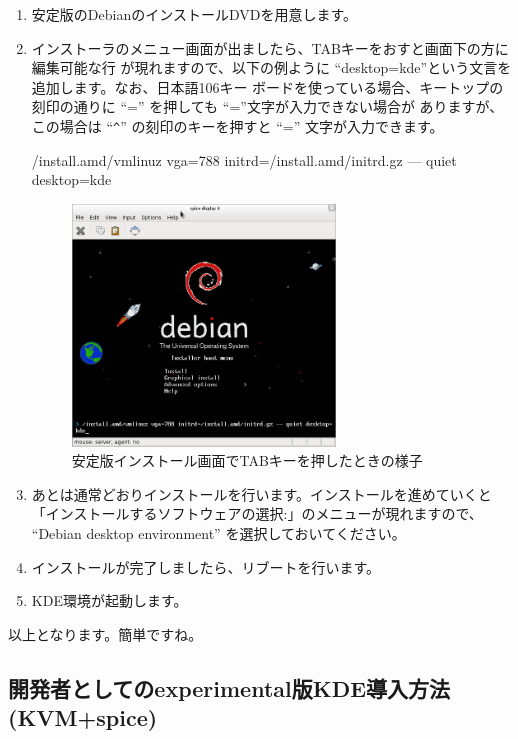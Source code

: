 \documentclass[mingoth,a4paper]{jsarticle}
\begin{document}
\begin{enumerate}
 \item 安定版のDebianのインストールDVDを用意します。
 \item インストーラのメニュー画面が出ましたら、TABキーをおすと画面下の方に編集可能な行
が現れますので、以下の例ように ``desktop=kde''という文言を追加します。なお、日本語106キー
ボードを使っている場合、キートップの刻印の通りに ``='' を押しても ``=''文字が入力できない場合が
ありますが、この場合は ``\verb|^|'' の刻印のキーを押すと ``='' 文字が入力できます。

\begin{commandline}
 /install.amd/vmlinuz vga=788 initrd=/install.amd/initrd.gz --- quiet desktop=kde
\end{commandline}

\begin{figure}[ht]
\begin{center}
\includegraphics[width=7cm]{image201202/kdedesk/stable-inst-menu.png}
\caption{安定版インストール画面でTABキーを押したときの様子}
\end{center}
\end{figure}
\item あとは通常どおりインストールを行います。インストールを進めていくと
「インストールするソフトウェアの選択:」のメニューが現れますので、 ``Debian desktop environment''
を選択しておいてください。
\item インストールが完了しましたら、リブートを行います。
\item KDE環境が起動します。
\end{enumerate}

以上となります。簡単ですね。

\subsection{開発者としてのexperimental版KDE導入方法(KVM+spice)}
\label{sec:exp-kde}
\end{document}
